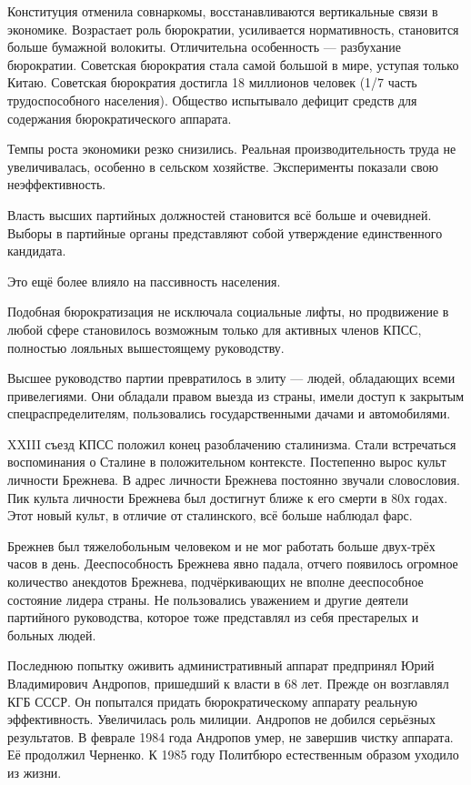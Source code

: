 \documentclass{article}
\begin{document}
Конституция отменила совнаркомы, восстанавливаются вертикальные связи в экономике. Возрастает роль бюрократии, усиливается нормативность, становится больше бумажной волокиты. Отличительна особенность --- разбухание бюрократии. Советская бюрократия стала самой большой в мире, уступая только Китаю. Советская бюрократия достигла 18 миллионов человек (1/7 часть трудоспособного населения). Общество испытывало дефицит средств для содержания бюрократического аппарата.

Темпы роста экономики резко снизились. Реальная производительность труда не увеличивалась, особенно в сельском хозяйстве. Эксперименты показали свою неэффективность.

Власть высших партийных должностей становится всё больше и очевидней. Выборы в партийные органы представляют собой утверждение единственного кандидата.

Это ещё более влияло на пассивность населения.

Подобная бюрократизация не исключала социальные лифты, но продвижение в любой сфере становилось возможным только для активных членов КПСС, полностью лояльных вышестоящему руководству.

Высшее руководство партии превратилось в элиту --- людей, обладающих всеми привелегиями. Они обладали правом выезда из страны, имели доступ к закрытым спецраспределителям, пользовались государственными дачами и автомобилями.

XXIII съезд КПСС положил конец разоблачению сталинизма. Стали встречаться воспоминания о Сталине в положительном контексте. Постепенно вырос культ личности Брежнева. В адрес личности Брежнева постоянно звучали словословия. Пик культа личности Брежнева был достигнут ближе к его смерти в 80х годах. Этот новый культ, в отличие от сталинского, всё больше наблюдал фарс.

Брежнев был тяжелобольным человеком и не мог работать больше двух-трёх часов в день. Дееспособность Брежнева явно падала, отчего появилось огромное количество анекдотов Брежнева, подчёркивающих не вполне дееспособное состояние лидера страны. Не пользовались уважением и другие деятели партийного руководства, которое тоже представлял из себя престарелых и больных людей.

Последнюю попытку оживить административный аппарат предпринял Юрий Владимирович Андропов, пришедший к власти в 68 лет. Прежде он возглавлял КГБ СССР. Он попытался придать бюрократическому аппарату реальную эффективность. Увеличилась роль милиции. Андропов не добился серьёзных результатов. В феврале 1984 года Андропов умер, не завершив чистку аппарата. Её продолжил Черненко. К 1985 году Политбюро естественным образом уходило из жизни.
\end{document}
